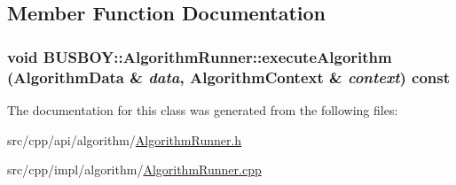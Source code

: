 \subsection{Member Function Documentation}
\hypertarget{classBUSBOY_1_1AlgorithmRunner_aa41dc0a176b15078a37988c560d3b6a3}{
\subsubsection[{executeAlgorithm}]{\setlength{\rightskip}{0pt plus 5cm}void BUSBOY::AlgorithmRunner::executeAlgorithm ({\bf AlgorithmData} \& {\em data}, \/  {\bf AlgorithmContext} \& {\em context}) const}}
\label{classBUSBOY_1_1AlgorithmRunner_aa41dc0a176b15078a37988c560d3b6a3}


The documentation for this class was generated from the following files:\begin{DoxyCompactItemize}
\item 
src/cpp/api/algorithm/\hyperlink{AlgorithmRunner_8h}{AlgorithmRunner.h}\item 
src/cpp/impl/algorithm/\hyperlink{AlgorithmRunner_8cpp}{AlgorithmRunner.cpp}\end{DoxyCompactItemize}
